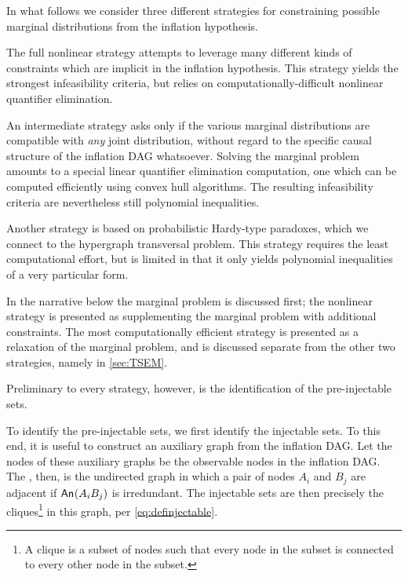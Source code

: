 In what follows we consider three different strategies for constraining possible marginal distributions from the inflation hypothesis. 
\begin{compactitem}
\item The full nonlinear strategy attempts to leverage many different kinds of constraints which are implicit in the inflation hypothesis. This strategy yields the strongest infeasibility criteria, but relies on computationally-difficult nonlinear quantifier elimination.
\item An intermediate strategy asks only if the various marginal distributions are compatible with \emph{any} joint distribution, without regard to the specific causal structure of the inflation DAG whatsoever. Solving the marginal problem amounts to a special linear quantifier elimination computation, one which can be computed efficiently using convex hull algorithms. The resulting infeasibility criteria are nevertheless still polynomial inequalities.
\item Another strategy is based on probabilistic Hardy-type paradoxes, which we connect to the hypergraph transversal problem. This strategy requires the least computational effort, but is limited in that it only yields polynomial inequalities of a very particular form.
\end{compactitem}

In the narrative below the marginal problem is discussed first; the nonlinear strategy is presented as supplementing the marginal problem with additional constraints. The most computationally efficient strategy is presented as a relaxation of the marginal problem, and is discussed separate from the other two strategies, namely in \cref{sec:TSEM}.

Preliminary to every strategy, however, is the identification of the pre-injectable sets.


\label{step:findpreinjectable}

To identify the pre-injectable sets, we first identify the injectable sets. To this end, it is useful to construct an auxiliary graph from the inflation DAG. Let the nodes of these auxiliary graphs be the observable nodes in the inflation DAG. The , then, is the undirected graph in which a pair of nodes $A_i$ and $B_j$ are adjacent if  ${\mathsf{An}_{}}\lparen A_i B_j\rparen$ is irredundant. The injectable sets are then precisely the cliques\footnote{A clique is a subset of nodes such that every node in the subset is connected to every other node in the subset.} in this graph, per \cref{eq:definjectable}. 

